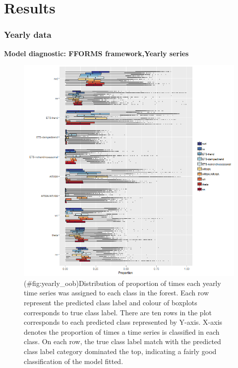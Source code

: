 \documentclass[11pt,a4paper,]{article}
\theoremstyle{definition}
\theoremstyle{definition}
\theoremstyle{definition}
\theoremstyle{remark}
\begin{document}
\newpage

\section{Results}\label{results}

\subsubsection{Yearly data}\label{yearly-data}

\textbf{Model diagnostic: FFORMS framework,Yearly series}

\begin{figure}
\centering
\includegraphics{figures/yearly_oob-1.png}
\caption{(\#fig:yearly\_oob)Distribution of proportion of times each
yearly time series was assigned to each class in the forest. Each row
represent the predicted class label and colour of boxplots corresponds
to true class label. There are ten rows in the plot corresponds to each
predicted class represented by Y-axis. X-axis denotes the proportion of
times a time series is classified in each class. On each row, the true
class label match with the predicted class label category dominated the
top, indicating a fairly good classification of the model fitted.}
\end{figure}
\end{document}
